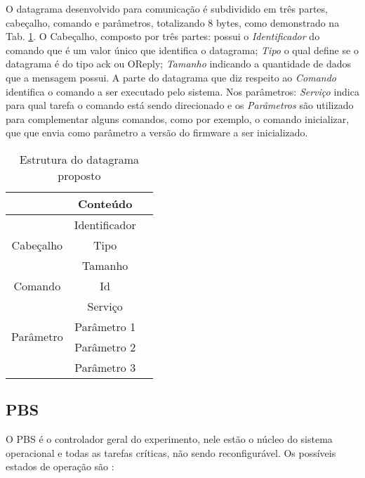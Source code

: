 \documentclass[journal,a4paper,oneside,twocolumn]{IEEEtran}
\begin{document}
	O datagrama desenvolvido para comunicação é subdividido em três partes, cabeçalho, comando e parâmetros, totalizando 8 bytes, como demonstrado na Tab. \ref{tab:datagrama}. O Cabeçalho, composto por três partes: possui o \textit{Identificador} do comando que é um valor único que identifica o datagrama; \textit{Tipo} o qual define se o datagrama é do tipo ack ou OReply; \textit{Tamanho} indicando a quantidade de dados que a mensagem possui. A parte do datagrama que diz respeito ao \textit{Comando} identifica o comando a ser executado pelo sistema. Nos parâmetros: \textit{Serviço} indica para qual tarefa o comando está sendo direcionado e os \textit{Parâmetros} são utilizado para complementar alguns comandos, como por exemplo, o comando inicializar, que que envia como parâmetro a versão do firmware a ser inicializado.
	
	
	
\begin{table}[!t]
\centering
		\begin{tabular}{ c c c}
			 & Conteúdo  \\
			\hline 
			
			\multirow{3}{*}{Cabeçalho} 
			& Identificador \\  
			& Tipo \\  
			& Tamanho \\
			
			\multirow{1}{*}{Comando} 
			& Id \\  
			
			\multirow{4}{*}{Parâmetro} 
			& Serviço \\  
			& Parâmetro 1 \\  
			& Parâmetro 2 \\  
			& Parâmetro 3 \\  
			
			\end{tabular} 
			\caption{Estrutura do datagrama proposto}
			\label{tab:datagrama}
\end{table}

\subsection{PBS}	

	 O PBS é o controlador geral do experimento, nele estão o núcleo do sistema operacional e todas as tarefas críticas, não sendo reconfigurável. Os possíveis estados de operação são :
		
\end{document}
